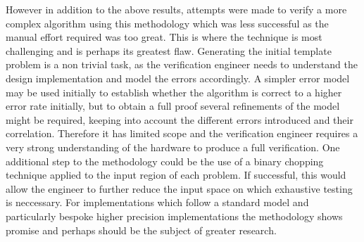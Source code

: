\documentclass[a4]{article}
\begin{document}
However in addition to the above results, attempts were made to verify a more complex algorithm using this methodology which was less successful as the manual effort required was too great. This is where the technique is most challenging and is perhaps its greatest flaw. Generating the initial template problem is a non trivial task, as the verification engineer needs to understand the design implementation and model the errors accordingly. A simpler error model may be used initially to establish whether the algorithm is correct to a higher error rate initially, but to obtain a full proof several refinements of the model might be required, keeping into account the different errors introduced and their correlation. Therefore it has limited scope and the verification engineer requires a very strong understanding of the hardware to produce a full verification. One additional step to the methodology could be the use of a binary chopping technique applied to the input region of each problem. If successful, this would allow the engineer to further reduce the input space on which exhaustive testing is neccessary. For implementations which follow a standard model and particularly bespoke higher precision implementations the methodology shows promise and perhaps should be the subject of greater research.


\end{document}
